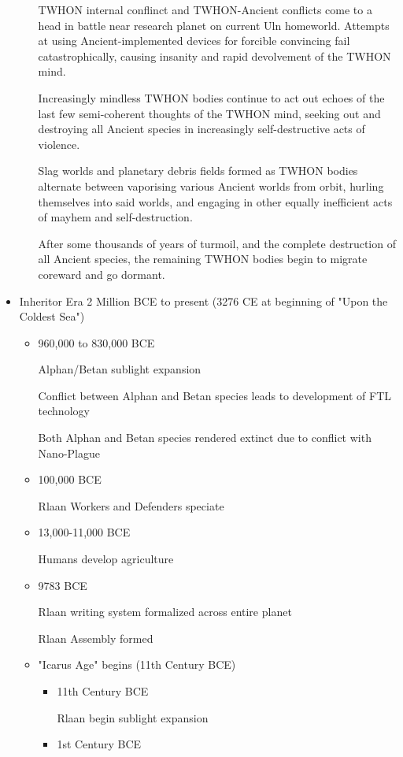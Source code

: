 \begin{itemize}
\begin{itemize}
TWHON internal conflinct and TWHON-Ancient conflicts come to a head in
battle near research planet on current Uln homeworld. Attempts at
using Ancient-implemented devices for forcible convincing fail
catastrophically, causing insanity and rapid devolvement of the TWHON
mind.

Increasingly mindless TWHON bodies continue to act out echoes of the
last few semi-coherent thoughts of the TWHON mind, seeking out and
destroying all Ancient species in increasingly self-destructive acts
of violence.

Slag worlds and planetary debris fields formed as TWHON bodies
alternate between vaporising various Ancient worlds from orbit,
hurling themselves into said worlds, and engaging in other equally
inefficient acts of mayhem and self-destruction.

After some thousands of years of turmoil, and the complete destruction
of all Ancient species, the remaining TWHON bodies begin to migrate
coreward and go dormant.

\end{itemize}
\item Inheritor Era  2 Million BCE to present (3276 CE at beginning of "Upon the Coldest Sea")
\begin{itemize}
\item	 960,000 to  830,000 BCE 

Alphan/Betan sublight expansion 

Conflict between Alphan and Betan species leads to development of FTL technology 

Both Alphan and Betan species rendered extinct due to conflict with Nano-Plague 
\item	 100,000 BCE 

Rlaan Workers and Defenders speciate 
\item	 13,000-11,000 BCE 

Humans develop agriculture 
\item	9783 BCE 

Rlaan writing system formalized across entire planet 

Rlaan Assembly formed 

\item "Icarus Age" begins (11th Century BCE)
\begin{itemize}
\item	11th Century BCE 

Rlaan begin sublight expansion 
\item	1st Century BCE 


\end{itemize}
\end{itemize}
\end{itemize}
